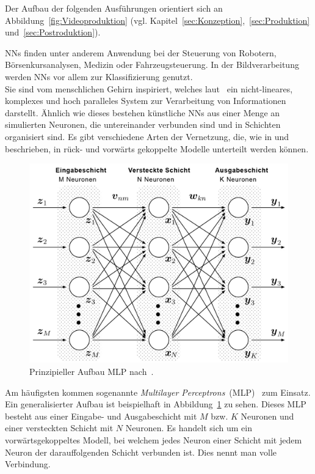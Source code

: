 \documentclass[times, 11pt,twocolumn]{article}
\begin{document}
Der Aufbau der folgenden Ausführungen orientiert sich an Abbildung~\ref{fig:Videoproduktion} (vgl. Kapitel~\ref{sec:Konzeption},~\ref{sec:Produktion} und~\ref{sec:Postroduktion}).



 \label{sec:NeuronaleNetze}
NNs finden unter anderem Anwendung bei der Steuerung von Robotern, Börsenkursanalysen, Medizin oder Fahrzeugsteuerung. In der Bildverarbeitung werden NNs vor allem zur Klassifizierung genutzt. \\
Sie sind vom menschlichen Gehirn inspiriert, welches laut~\cite{NNHaykin} ein nicht-lineares, komplexes und hoch paralleles System zur Verarbeitung von Informationen darstellt. Ähnlich wie dieses bestehen künstliche NNs aus einer Menge an simulierten Neuronen, die untereinander verbunden sind und in Schichten organisiert sind. Es gibt verschiedene Arten der Vernetzung, die, wie in \cite{NNHaykin} und \cite{NNStanley} beschrieben, in rück- und vorwärts gekoppelte Modelle unterteilt werden können.\\
\begin{figure}
	\flushleft
	\includegraphics[width=\columnwidth]{Bilder/structure-mlp.jpg}
	\caption{Prinzipieller Aufbau MLP nach~\cite{MDPI}.}
	\label{fig:MLP}
\end{figure}
Am häufigsten kommen sogenannte \textit{Multilayer Perceptrons}~(MLP)~\cite{NNBraun}\cite{NNNauck}\cite{NNStanley} zum Einsatz. Ein generalisierter Aufbau ist beispielhaft in Abbildung~\ref{fig:MLP} zu sehen. Dieses MLP besteht aus einer Eingabe- und Ausgabeschicht mit $M$ bzw. $K$ Neuronen und einer versteckten Schicht mit $N$ Neuronen. Es handelt sich um ein vorwärtsgekoppeltes Modell, bei welchem jedes Neuron einer Schicht mit jedem Neuron der darauffolgenden Schicht verbunden ist. Dies nennt man volle Verbindung. \\
\end{document}
